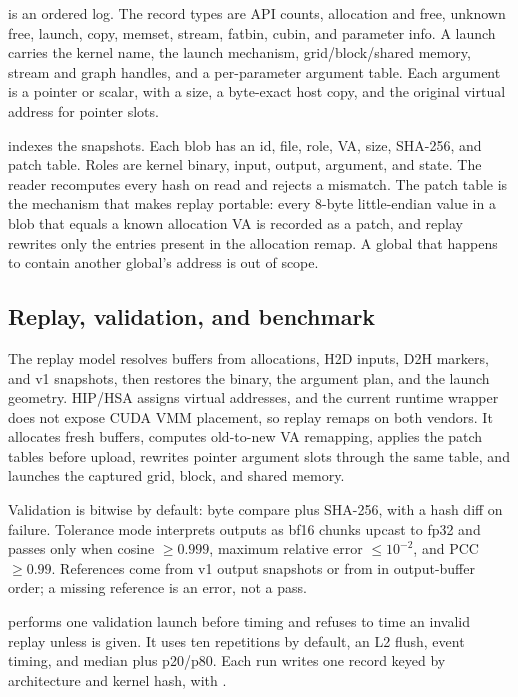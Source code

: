  is an ordered log. The record types are API counts,
allocation and free, unknown free, launch, copy, memset, stream, fatbin,
cubin, and parameter info. A launch carries the kernel name, the launch
mechanism, grid/block/shared memory, stream and graph handles, and a
per-parameter argument table. Each argument is a pointer or scalar, with a
size, a byte-exact host copy, and the original virtual address for pointer
slots.

 indexes the snapshots. Each blob has an id, file, role, VA,
size, SHA-256, and patch table. Roles are kernel binary, input, output,
argument, and state. The reader recomputes every hash on read and rejects a
mismatch. The patch table is the mechanism that makes replay portable: every
8-byte little-endian value in a blob that equals a known allocation VA is
recorded as a patch, and replay rewrites only the entries present in the
allocation remap. A  global that happens to contain another
global's address is out of scope.

\subsection{Replay, validation, and benchmark}
\label{sec:c4-replay}

The replay model resolves buffers from allocations, H2D inputs, D2H markers,
and v1 snapshots, then restores the binary, the argument plan, and the launch
geometry. HIP/HSA assigns virtual addresses, and the current runtime wrapper
does not expose CUDA VMM placement, so replay remaps on both vendors. It
allocates fresh buffers, computes old-to-new VA remapping, applies the patch
tables before upload, rewrites pointer argument slots through the same table,
and launches the captured grid, block, and shared memory.

Validation is bitwise by default: byte compare plus SHA-256, with a hash diff
on failure. Tolerance mode interprets outputs as bf16 chunks upcast to fp32
and passes only when cosine $\ge 0.999$, maximum relative error
$\le 10^{-2}$, and PCC $\ge 0.99$. References come from v1 output snapshots
or from  in output-buffer order; a missing reference is an error,
not a pass.

 performs one validation launch before timing and refuses to time
an invalid replay unless  is given. It uses ten repetitions
by default, an L2 flush, event timing, and median plus p20/p80. Each run
writes one  record keyed by architecture and kernel hash, with
.

